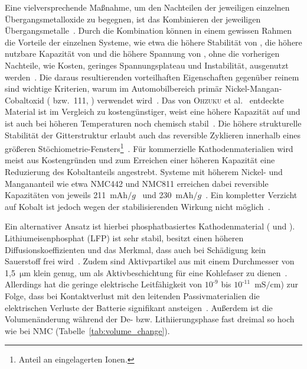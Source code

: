 Eine vielversprechende Maßnahme, um den Nachteilen der jeweiligen einzelnen Übergangsmetalloxide zu begegnen, ist das Kombinieren der jeweiligen Übergangsmetalle~\cite{Biasi2017}. Durch die Kombination können in einem gewissen Rahmen die Vorteile der einzelnen Systeme, wie etwa die höhere Stabilität von , die höhere nutzbare Kapazität von  und die höhere Spannung von , ohne die vorherigen Nachteile, wie Kosten, geringes Spannungsplateau und Instabilität, ausgenutzt werden~\cite{Ren2023}.
Die daraus resultierenden vorteilhaften Eigenschaften gegenüber reinem  sind wichtige Kriterien, warum im Automobilbereich primär Nickel-Mangan-Cobaltoxid ( bzw.\ 111, ) verwendet wird~\cite{Burow2016}. Das von \textsc{Ohzuku} et al.~\cite{Ohzuku2001, Yabuuchi2003} entdeckte Material ist im Vergleich zu  kostengünstiger, weist eine höhere Kapazität auf und ist auch bei höheren Temperaturen noch chemisch stabil~\cite{Kim2016,Zheng2012}. 
Die höhere strukturelle Stabilität der Gitterstruktur erlaubt auch das reversible Zyklieren innerhalb eines größeren Stöchiometrie-Fensters\footnote{Anteil an eingelagerten Ionen.}~\cite{Dolotko2014,Choi2005}. 
Für kommerzielle Kathodenmaterialien wird meist aus Kostengründen und zum Erreichen einer höheren Kapazität eine Reduzierung des Kobaltanteils angestrebt. Systeme mit höherem Nickel- und Mangananteil wie etwa NMC442 und NMC811 erreichen dabei reversible Kapazitäten von jeweils 211~$\si{\milli \ampere \hour \per g}$~\cite{Ma2014} und 230~$\si{\milli \ampere \hour \per g}$~\cite{Xue2021}. Ein kompletter Verzicht auf Kobalt ist jedoch wegen der stabilisierenden Wirkung nicht möglich~\cite{Ren2023}.

Ein alternativer Ansatz ist hierbei phosphatbasiertes Kathodenmaterial ( und ). Lithiumeisenphosphat (LFP) ist sehr stabil, besitzt einen höheren Diffusionskoeffizienten und das Merkmal, dass auch bei Schädigung kein Sauerstoff frei wird~\cite{Ling2021}. Zudem sind Aktivpartikel aus  mit einem Durchmesser von 1,5~$\si{\um}$ klein genug, um als Aktivbeschichtung für eine Kohlefaser zu dienen~\cite{Yuecel2023}.
Allerdings hat die geringe elektrische Leitfähigkeit von $10^{\text{-}9}$ bis $10^{\text{-}11}$~$\si{\milli \siemens \per \cm}$) zur Folge, dass bei Kontaktverlust mit den leitenden Passivmaterialien die elektrischen Verluste der Batterie signifikant ansteigen~\cite{Padhi1997}. Außerdem ist die Volumenänderung während der De- bzw. Lithiierungsphase fast dreimal so hoch wie bei NMC (Tabelle~\ref{tab:volume_change}).

